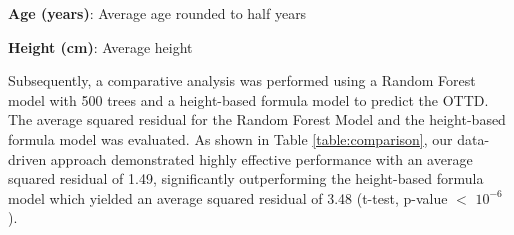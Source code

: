 \documentclass[11pt]{article}
\begin{document}
\begin{table}[h]
\caption{Descriptive statistics of height and age stratified by sex}
\label{table:statistics}
\begin{threeparttable}
\renewcommand{\TPTminimum}{\linewidth}
\begin{tablenotes}
\footnotesize
\item \textbf{Age (years)}: Average age rounded to half years
\item \textbf{Height (cm)}: Average height
\end{tablenotes}
\end{threeparttable}
\end{table}


Subsequently, a comparative analysis was performed using a Random Forest model with 500 trees and a height-based formula model to predict the OTTD. The average squared residual for the Random Forest Model and the height-based formula model was evaluated. As shown in Table {}\ref{table:comparison}, our data-driven approach demonstrated highly effective performance with an average squared residual of 1.49, significantly outperforming the height-based formula model which yielded an average squared residual of 3.48 (t-test, p-value $<$ $10^{-6}$). 

\begin{table}[h]
\caption{Comparison of Random Forest model with Height-based model for predicting the optimal tracheal tube depth (OTTD)}
\label{table:comparison}
\begin{threeparttable}
\renewcommand{\TPTminimum}{\linewidth}
\begin{tablenotes}
\footnotesize
\item 
\end{tablenotes}
\end{threeparttable}
\end{table}
\end{document}
